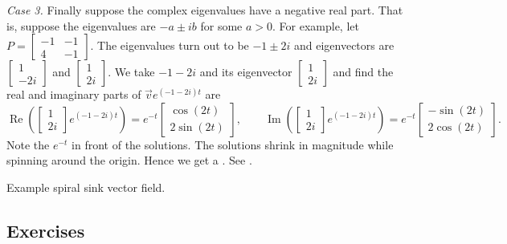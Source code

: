 \emph{Case 3.} Finally suppose the complex eigenvalues have a negative real
part.  That is, suppose the eigenvalues are $-a \pm ib$ for some $a > 0$.
For example, let $P = 
\left[ \begin{smallmatrix} -1 & -1 \\ 4 & -1 \end{smallmatrix} \right]$.
The eigenvalues turn out to be $-1\pm 2i$ and eigenvectors are
$\left[ \begin{smallmatrix} 1 \\ -2i \end{smallmatrix} \right]$ and
$\left[ \begin{smallmatrix} 1 \\ 2i \end{smallmatrix} \right]$.  We take
$-1 - 2i$ and its eigenvector
$\left[ \begin{smallmatrix} 1 \\ 2i \end{smallmatrix} \right]$ and find
the real and imaginary parts of
$\vec{v} e^{(-1-2i)t}$ are
\begin{equation*}
\operatorname{Re}\left(
\begin{bmatrix} 1 \\ 2i \end{bmatrix} e^{(-1-2i)t}\right) =
e^{-t}
\begin{bmatrix} \cos (2t) \\ 2 \sin (2t)  \end{bmatrix} ,
\qquad
\operatorname{Im}\left(
\begin{bmatrix} 1 \\ 2i \end{bmatrix} e^{(-1-2i)t}\right) =
e^{-t}
\begin{bmatrix} -\sin (2t) \\ 2 \cos (2t) \end{bmatrix} .
\end{equation*}
Note the $e^{-t}$ in front of the solutions.  The solutions
shrink in magnitude while spinning around the origin.  Hence we get
a \emph{}.
See .

\begin{myfig}
\capstart
{}
\caption{Example spiral sink vector field.\label{pln:spiral-sinkfig}}
\end{myfig}


\subsection{Exercises}


